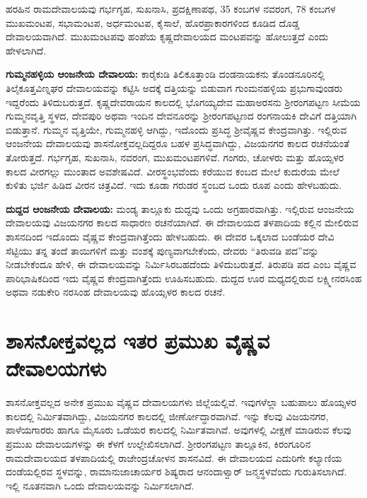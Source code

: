 \vskip 3pt

ಹರಹಿನ ರಾಮದೇವಾಲಯವು ಗರ್ಭಗೃಹ, ಸುಖನಾಸಿ, ಪ್ರದಕ್ಷಿಣಾಪಥ, 35 ಕಂಬಗಳ ನವರಂಗ, 78 ಕಂಬಗಳ ಮುಖಮಂಟಪ, ಸಭಾಮಂಟಪ, ಅರ್ಧಮಂಟಪ, ಕೈಸಾಲೆ, ಹೊರಪ್ರಾಕಾರಗಳಿಂದ ಕೂಡಿದ ದೊಡ್ಡ ದೇವಾಲಯವಾಗಿದೆ. ಮುಖಮಂಟಪವು ಹಂಪೆಯ ಕೃಷ್ಣದೇವಾಲಯದ ಮಂಟಪವನ್ನು ಹೋಲುತ್ತದೆ ಎಂದು ಹೇಳಲಾಗಿದೆ.

\vskip 3pt

\textbf{ಗುಮ್ಮನಹಳ್ಳಿಯ ಆಂಜನೇಯ ದೇವಾಲಯ: } ಕಾರೈಕುಡಿ ತಿಲಿಕೂತ್ತಾಂಡಿ ದಂಡನಾಯಕನು ತೊಂಡನೂರಿನಲ್ಲಿ ತಿಲೈಕೂತ್ತವಿಣ್ನಘರ ದೇವಾಲಯವನ್ನು ಕಟ್ಟಿಸಿ ಅದಕ್ಕೆ ದತ್ತಿಯನ್ನು ಬಿಡುವಾಗ ಗುಂಮನಹಳ್ಳಿಯ ಪ್ರಭುಗಾವುಂಡರು ಇದ್ದರೆಂದು ತಿಳಿದುಬರುತ್ತದೆ. ಕೃಷ್ಣದೇವರಾಯನ ಕಾಲದಲ್ಲಿ ಭೊಗಯ್ಯದೇವ ಮಹಾಅರಸನು ಶ‍್ರೀರಂಗಪಟ್ಟಣ ಸೀಮೆಯ ಗುಮ್ಮನವೃತ್ತಿ ಸ್ಥಳದ, ದೇವಪುರಿ ಅಥವಾ ಇಂದಿನ ದೇವನೂರನ್ನು ಶ‍್ರೀರಂಗಪಟ್ಟಣದ ರಂಗನಾಯಕಿ ದೇವಿಗೆ ದತ್ತಿಯಾಗಿ ಬಿಡುತ್ತಾನೆ. ಗುಮ್ಮನ ವೃತ್ತಿಯೇ, ಗುಮ್ಮನಹಳ್ಳಿ ಆಗಿದ್ದು, ಇದೊಂದು ಪ್ರಸಿದ್ಧ ಶ‍್ರೀವೈಷ್ಣವ ಕೇಂದ್ರವಾಗಿತ್ತು. ಇಲ್ಲಿರುವ ಆಂಜನೇಯ ದೇವಾಲಯವು ಶಾಸನೋಕ್ತವಲ್ಲದಿದ್ದರೂ ಬಹಳ ಪ್ರಸಿದ್ಧವಾಗಿದ್ದು, ವಿಜಯನಗರ ಕಾಲದ ರಚನೆಯಂತೆ ತೋರುತ್ತದೆ. ಗರ್ಭಗೃಹ, ಸುಖನಾಸಿ, ನವರಂಗ, ಮುಖಮಂಟಪಗಳಿವೆ. ಗಂಗರು, ಚೋಳರು ಮತ್ತು ಹೊಯ್ಸಳರ ಕಾಲದ ವೀರಗಲ್ಲು ಮುಂತಾದ ಅವಶೇಷವಿದೆ. ವೀರಸ್ಥಂಭವೆಂದು ಕರೆಯುವ ಕಂಬದ ಮೇಲೆ ಕುದುರೆಯ ಮೇಲೆ ಕುಳಿತು ಭರ್ಜಿ ಹಿಡಿದ ವೀರನ ಚಿತ್ರವಿದೆ. ಇದು ಕೂಡಾ ಗರುಡರ ಸ್ಥಂಬದ ಒಂದು ರೂಪ ಎಂದು ಹೇಳಬಹುದು.

\textbf{ದುದ್ದದ ಆಂಜನೇಯ ದೇವಾಲಯ:} ಮಂಡ್ಯ ತಾಲ್ಲೂಕು ದುದ್ದವು ಒಂದು ಅಗ್ರಹಾರವಾಗಿತ್ತು. ಇಲ್ಲಿರುವ ಆಂಜನೇಯ ದೇವಾಲಯವು ವಿಜಯನಗರ ಕಾಲದ ಸಾಧಾರಣ ರಚನೆಯಾಗಿದೆ. ಈ ದೇವಾಲಯದ ತಳಪಾದಿಯ ಕಲ್ಲಿನ ಮೇಲಿರುವ ಶಾಸನದಿಂದ ಇದೊಂದು ವೈಷ್ಣವ ಕೇಂದ್ರವಾಗಿತ್ತೆಂದು ಹೇಳಬಹುದು. ಈ ದೇವರ ಒಕ್ಕಲಾದ ಬಂಡೆಯರ ದೇವಿ ಸೆಟ್ಟಿಯು ತನ್ನ ತಂದೆ ತಾಯಿಗಳಿಗೆ ಮತ್ತು ವಂಶಕ್ಕೆ ಪುಣ್ಯವಾಗಬೇಕೆಂದು, ದೇವರು “ತಿರುವಡಿ ಪದ”ವನ್ನು ನೀಡಬೇಕೆಂದೂ ಹೇಳಿ, ಈ ದೇವಾಲಯವನ್ನು ನಿರ್ಮಿಸಿರಬಹದೆಂದು ತಿಳಿದುಬರುತ್ತದೆ. ತಿರುಪಡಿ ಪದ ಎಂಬ ವೈಷ್ಣವ ಪಾರಿಭಾಷಿಕದಿಂದ ಇದು ವೈಷ್ಣವ ಕೇಂದ್ರವಾಗಿತ್ತೆಂದು ಊಹಿಸಬಹುದು. ದುದ್ದದ ಊರ ಮಧ್ಯದಲ್ಲಿರುವ ಲಕ್ಷ್ಮೀನರಸಿಂಹ ಅಥವಾ ನಡುಕೇರಿ ನರಸಿಂಹ ದೇವಾಲಯವು ಹೊಯ್ಸಳರ ಕಾಲದ ರಚನೆ.


\section*{ಶಾಸನೋಕ್ತವಲ್ಲದ ಇತರ ಪ್ರಮುಖ ವೈಷ್ಣವ ದೇವಾಲಯಗಳು}

ಶಾಸನೋಕ್ತವಲ್ಲದ ಅನೇಕ ಪ್ರಮುಖ ವೈಷ್ಣವ ದೇವಾಲಯಗಳು ಜಿಲ್ಲೆಯಲ್ಲಿವೆ. ಇವುಗಳೆಲ್ಲಾ ಬಹುಪಾಲು ಹೊಯ್ಸಳರ ಕಾಲದಲ್ಲಿ ನಿರ್ಮಿತವಾಗಿದ್ದು, ವಿಜಯನಗರ ಕಾಲದಲ್ಲಿ ಜೀರ್ಣೋದ್ಧಾರವಾಗಿವೆ. ಇನ್ನು ಕೆಲವು ವಿಜಯನಗರ, ಪಾಳೆಯಗಾರರು ಹಾಗೂ ಮೈಸೂರು ಒಡೆಯರ ಕಾಲದಲ್ಲಿ ನಿರ್ಮಿತವಾಗಿವೆ. ಅವುಗಳಲ್ಲಿ ವೀಕ್ಷಣೆ ಮಾಡಿರುವ ಕೆಲವು ಪ್ರಮುಖ ದೇವಾಲಯಗಳನ್ನು ಈ ಕೆಳಗೆ ಉಲ್ಲೇಖಿಸಲಾಗಿದೆ. ಶ‍್ರೀರಂಗಪಟ್ಟಣ ತಾಲ್ಲೂಕಿನ, ಕಿರಂಗೂರಿನ ರಾಮದೇವಾಲಯದ ತಳಪಾದಿಯಲ್ಲಿ ರಾಜೇಂದ್ರಚೋಳನ ಶಾಸನವಿದೆ. ಈ ದೇವಾಲಯದ ಎದುರಿಗೇ ಕಲ್ಯಾಣಿಯ ದಂಡೆಯಲ್ಲಿರವ ಸ್ಥಳವನ್ನು, ರಾಮಾನುಜಾಚಾರ್ಯರ ಶಿಷ್ಯರಾದ ಆನಂದಾಳ್ವಾರ್​ ಜನ್ಮಸ್ಥಳವೆಂದು ಗುರುತಿಸಲಾಗಿದೆ. ಇಲ್ಲಿ ನೂತನವಾಗಿ ಒಂದು ದೇವಾಲಯವನ್ನು ನಿರ್ಮಿಸಲಾಗಿದೆ.

